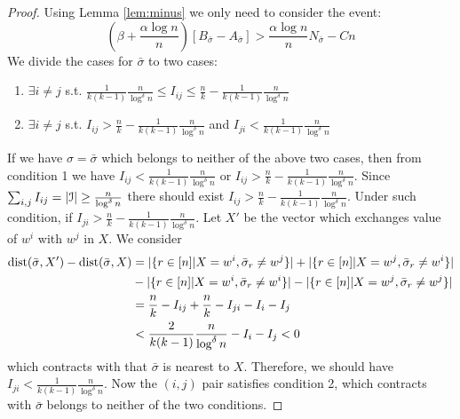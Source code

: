 \documentclass{article}
\begin{document}
\begin{proof}
	Using Lemma \ref{lem:minus} we only need to consider the event:
	\begin{equation}\label{eq:BwA}
	(\beta + \frac{\alpha \log n}{n})[B_{\bar{\sigma}} - A_{\bar{\sigma}}] >  \frac{\alpha \log n}{n} N_{\bar{\sigma}}  - Cn
	\end{equation}
	We divide the cases for $\bar{\sigma}$ to two cases:
	\begin{enumerate}
		\item $\exists i\neq j$ s.t. $\frac{1}{k(k-1)}\frac{n}{\log^{\delta} n} \leq I_{ij} \leq \frac{n}{k} - \frac{1}{k(k-1)}\frac{n}{\log^{\delta} n}$
		\item $\exists i \neq j$ s.t. $I_{ij} > \frac{n}{k} - \frac{1}{k(k-1)}\frac{n}{\log^{\delta} n}$ and $I_{ji} < \frac{1}{k(k-1)}\frac{n}{\log^{\delta} n}$
	\end{enumerate}
	If we have $\sigma = \bar{\sigma}$ which belongs to neither of the above two cases, then from condition 1 we have
	$I_{ij} < \frac{1}{k(k-1)}\frac{n}{\log^{\delta} n}$ or $I_{ij} > \frac{n}{k} - \frac{1}{k(k-1)}\frac{n}{\log^{\delta} n}$.
	Since $\sum_{i,j} I_{ij} = |\mathcal{I}| \geq \frac{n}{\log^{\delta} n}$ there should exist $I_{ij} > \frac{n}{k} - \frac{1}{k(k-1)}\frac{n}{\log^{\delta} n}$.
	Under such condition, if $I_{ji} > \frac{n}{k} - \frac{1}{k(k-1)}\frac{n}{\log^{\delta} n}$.
	Let $X'$ be the vector which exchanges value of $w^i$ with $w^j$ in $X$. We consider
	\begin{align*}
	\operatorname{dist}(\bar{\sigma}, X') - \operatorname{dist}(\bar{\sigma}, X) &= |\{ r \in [n]|X=w^i, \bar{\sigma}_r \neq w^j \}| + |\{ r \in [n]|X=w^j, \bar{\sigma}_r \neq w^i \}| \\
	&-|\{ r \in [n]|X=w^i, \bar{\sigma}_r \neq w^i \}| - |\{ r \in [n]|X=w^j, \bar{\sigma}_r \neq w^j \}| \\
	& = \frac{n}{k} - I_{ij} +  \frac{n}{k} - I_{ji} - I_i - I_j \\
	& < \frac{2}{k(k-1)}\frac{n}{\log^{\delta} n} - I_i - I_j < 0
	\end{align*}
	which contracts with that $\bar{\sigma}$ is nearest to $X$.
	Therefore, we should have $I_{ji} < \frac{1}{k(k-1)}\frac{n}{\log^{\delta} n}$.
	Now the $(i, j)$ pair satisfies condition 2, which contracts with $\bar{\sigma}$ belongs to neither of the two conditions.
	

\end{proof}
\end{document}
